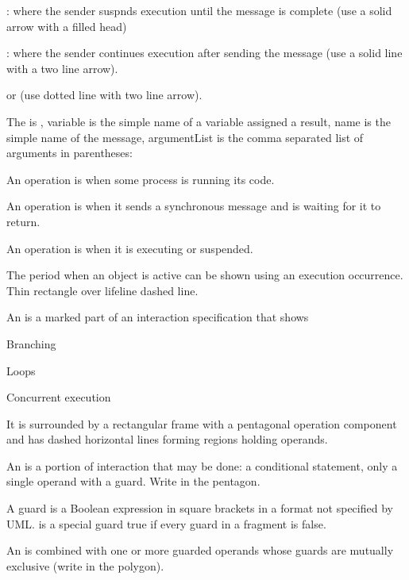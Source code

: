 \begin{compactitem}
\begin{compactitem}
\begin{compactitem}
\begin{compactitem}
\item {}: where the sender suspnds execution until the message is complete (use a solid arrow with a filled head)
\item {}: where the sender continues execution after sending the message (use a solid line with a two line arrow).
\item {} or  (use dotted line with two line arrow).
\item The  is , variable is the simple name of a variable assigned a result, name is the simple name of the message, argumentList is the comma separated list of arguments in parentheses: 
\end{compactitem}
\item An operation is  when some process is running its code.
\item An operation is  when it sends a synchronous message and is waiting for it to return.
\item An operation is  when it is executing or suspended.
\item The period when an object is active can be shown using an execution occurrence. Thin rectangle over lifeline dashed line.
\item An  is a marked part of an interaction specification that shows
\begin{compactitem} 
\item Branching
\item Loops
\item Concurrent execution
\end{compactitem}
It is surrounded by a rectangular frame with a pentagonal operation component and has dashed horizontal lines forming regions holding operands.
\item An  is a portion of interaction that may be done: a conditional statement, only a single operand with a guard. Write  in the pentagon.
\item A guard is a Boolean expression in square brackets in a format not specified by UML. \e{[else]} is a special guard true if every guard in a fragment is false.
\item An  is combined with one or more guarded operands whose guards are mutually exclusive (write  in the polygon).

\end{compactitem}
\end{compactitem}
\end{compactitem}
